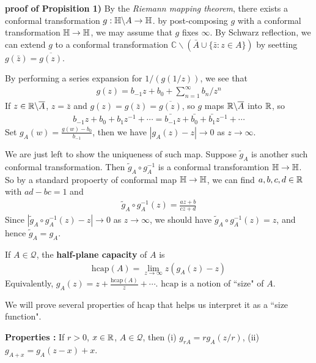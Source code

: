\documentclass[12pt,a4paper]{article}
\newenvironment{proof}
{\begin{changemargin}{0.5cm}{0.5cm} 
	}%
	{\end{changemargin}
}
\newenvironment{p}
{\begin{proof} 
	}%
	{\end{proof}
}
\begin{document}
\begin{p}
\textbf{proof of Propisition 1)} By the \emph{Riemann mapping theorem}, there exists a conformal transformation $g: \mathbb{H} \backslash A \rightarrow \mathbb{H}$. by post-composing $g$ with a conformal transformation $\mathbb{H}\rightarrow \mathbb{H}$, we may assume that $g$ fixes $\infty$. By Schwarz reflection, we can extend $g$ to a conformal transformation $\mathbb{C} \backslash ( \bar{A} \cup \{\bar{z} : z\in A\})$ by seetting $g(\bar{z}) = \overline{g(z)}$.

\quad By performing a series expansion for $1/(g(1/z))$, we see that
\begin{align*}
g(z) = b_{-1}z + b_0 + \sum_{n=1}^{\infty} b_n/z^n
\end{align*}
If $z\in \mathbb{R}\backslash \overline{A}$, $z= \bar{z}$ and $g(z) = g(\bar{z}) = \overline{g(z)}$, so $g$ maps $\mathbb{R} \backslash \overline{A}$ into $\mathbb{R}$, so
\begin{align*}
b_{-1} z + b_0 + b_1 z^{-1} + \cdots = \bar{b_{-1}}z + \bar{b_0} + \bar{b_1} z^{-1} + \cdots
\end{align*}
Set $g_A(w) = \frac{g(w)-b_0}{b_{-1}}$, then we have $|g_A(z) - z| \rightarrow 0$ as $z\rightarrow \infty$.

\quad We are just left to show the uniqueness of such map. Suppose $\tilde{g}_A$ is another such conformal transformation. Then $\tilde{g}_A \circ g_A^{-1}$ is a conformal transforamtion $\mathbb{H} \rightarrow \mathbb{H}$. So by a standard propoerty of conformal map $\mathbb{H} \rightarrow \mathbb{H}$, we can find $a, b,c,d\in \mathbb{R}$ with $ad-bc=1$ and
\begin{align*}
\tilde{g}_A \circ g_A^{-1} (z) = \frac{az+b}{cz+d}
\end{align*}
Since $|\tilde{g}_A \circ g_A^{-1} (z) -z| \rightarrow 0$ as $z\rightarrow \infty$, we should have $\tilde{g}_A \circ g_A^{-1} (z)=z$, and hence $\tilde{g}_A = g_A$.

\eop
\end{p}
\s

 If $A\in \mathscr{Q}$, the \textbf{half-plane capacity} of $A$ is
\begin{align*}
\text{hcap}(A) = \lim_{z\rightarrow \infty} z(g_A(z)-z)
\end{align*}
Equivalently, $g_A(z) = z + \frac{\text{hcap}(A)}{z} + \cdots$. $\text{hcap}$ is a notion of ``size" of $A$.

\quad We will prove several properties of $\text{hcap}$ that helps us interpret it as a ``size function".
\s

\textbf{Properties :} If $r>0$, $x\in \mathbb{R}$, $A\in \mathscr{Q}$, then (i) $g_{rA} = rg_A(z/r)$, (ii) $g_{A+x} = g_A(z-x)+x$.
\end{document}
